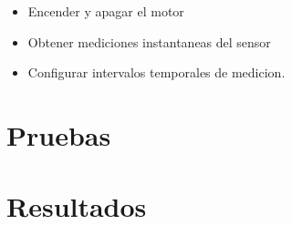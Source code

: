 \begin{itemize}
  \item Encender y apagar el motor
  \item Obtener mediciones instantaneas del sensor
  \item Configurar intervalos temporales de medicion. 
\end{itemize}






\section{Pruebas} %
\label{sec:pruebas}


\section{Resultados} %
\label{sec:resultados}


